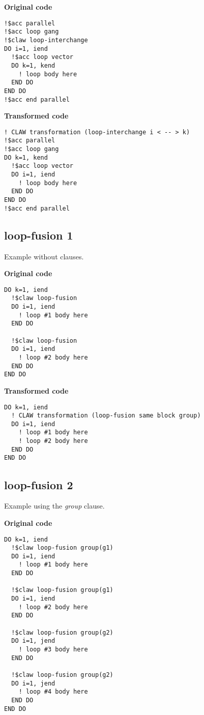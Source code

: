 \textbf{Original code}
\begin{lstlisting}
!$acc parallel
!$acc loop gang
!$claw loop-interchange
DO i=1, iend
  !$acc loop vector
  DO k=1, kend
    ! loop body here
  END DO
END DO
!$acc end parallel
\end{lstlisting}

\textbf{Transformed code}
\begin{lstlisting}
! CLAW transformation (loop-interchange i < -- > k)
!$acc parallel
!$acc loop gang
DO k=1, kend
  !$acc loop vector
  DO i=1, iend
    ! loop body here
  END DO
END DO
!$acc end parallel
\end{lstlisting}

\subsection{loop-fusion 1}
Example without clauses. 

\textbf{Original code}
\begin{lstlisting}
DO k=1, iend
  !$claw loop-fusion
  DO i=1, iend
    ! loop #1 body here
  END DO

  !$claw loop-fusion
  DO i=1, iend
    ! loop #2 body here
  END DO
END DO
\end{lstlisting}

\textbf{Transformed code}
\begin{lstlisting}
DO k=1, iend
  ! CLAW transformation (loop-fusion same block group)
  DO i=1, iend
    ! loop #1 body here
    ! loop #2 body here
  END DO
END DO
\end{lstlisting}

\subsection{loop-fusion 2}
\label{loop-fusion2}
Example using the \textit{group} clause.

\textbf{Original code}
\begin{lstlisting}
DO k=1, iend
  !$claw loop-fusion group(g1)
  DO i=1, iend
    ! loop #1 body here
  END DO

  !$claw loop-fusion group(g1)
  DO i=1, iend
    ! loop #2 body here
  END DO

  !$claw loop-fusion group(g2)
  DO i=1, jend
    ! loop #3 body here
  END DO

  !$claw loop-fusion group(g2)
  DO i=1, jend
    ! loop #4 body here
  END DO
END DO
\end{lstlisting}


